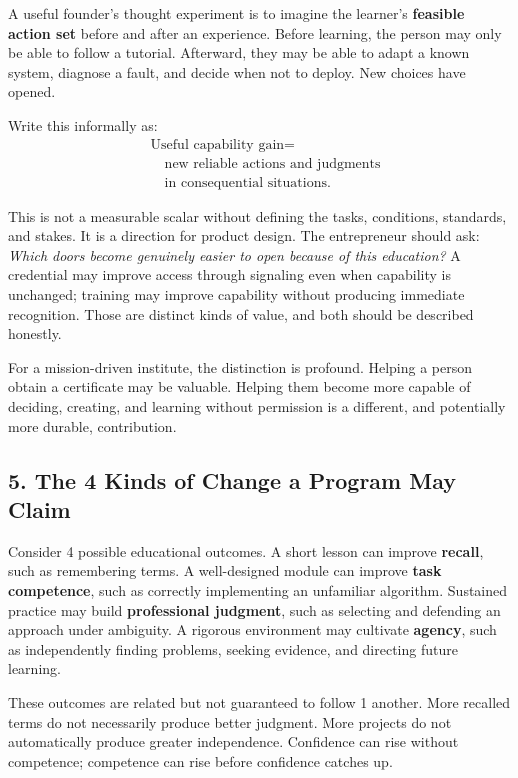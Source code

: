 A useful founder's thought experiment is to imagine the learner's \textbf{feasible action set} before and after an experience. Before learning, the person may only be able to follow a tutorial. Afterward, they may be able to adapt a known system, diagnose a fault, and decide when not to deploy. New choices have opened.

Write this informally as:
\begin{equation}
\begin{aligned}
&\text{Useful capability gain} = \\
&\quad\text{new reliable actions and judgments} \\
&\quad\text{in consequential situations}.
\end{aligned}
\end{equation}

This is not a measurable scalar without defining the tasks, conditions, standards, and stakes. It is a direction for product design. The entrepreneur should ask: \emph{Which doors become genuinely easier to open because of this education?} A credential may improve access through signaling even when capability is unchanged; training may improve capability without producing immediate recognition. Those are distinct kinds of value, and both should be described honestly.

For a mission-driven institute, the distinction is profound. Helping a person obtain a certificate may be valuable. Helping them become more capable of deciding, creating, and learning without permission is a different, and potentially more durable, contribution.

\subsection*{5. The 4 Kinds of Change a Program May Claim}

Consider 4 possible educational outcomes. A short lesson can improve \textbf{recall}, such as remembering terms. A well-designed module can improve \textbf{task competence}, such as correctly implementing an unfamiliar algorithm. Sustained practice may build \textbf{professional judgment}, such as selecting and defending an approach under ambiguity. A rigorous environment may cultivate \textbf{agency}, such as independently finding problems, seeking evidence, and directing future learning.

These outcomes are related but not guaranteed to follow 1 another. More recalled terms do not necessarily produce better judgment. More projects do not automatically produce greater independence. Confidence can rise without competence; competence can rise before confidence catches up.


